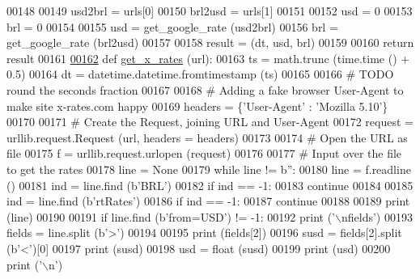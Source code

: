 \begin{DoxyCode}
00148     
00149     usd2brl = urls[0]
00150     brl2usd = urls[1]
00151     
00152     usd = 0
00153     brl = 0
00154     
00155     usd = get\_google\_rate (usd2brl)
00156     brl = get\_google\_rate (brl2usd)
00157     
00158     result = (dt, usd, brl)
00159     
00160     \textcolor{keywordflow}{return} result
00161         
\hyperlink{namespaceraw__urlparser_ab9602b24afd1ae28d96beb085c37410e}{00162} \textcolor{keyword}{def }\hyperlink{namespaceraw__urlparser_ab9602b24afd1ae28d96beb085c37410e}{get\_x\_rates} (url):
00163     ts = math.trunc (time.time () + 0.5)
00164     dt = datetime.datetime.fromtimestamp (ts)
00165     
00166     \textcolor{comment}{# TODO round the seconds fraction}
00167     
00168     \textcolor{comment}{# Adding a fake browser User-Agent to make site x-rates.com happy}
00169     headers = \{\textcolor{stringliteral}{'User-Agent'} : \textcolor{stringliteral}{'Mozilla 5.10'}\}
00170         
00171     \textcolor{comment}{# Create the Request, joining URL and User-Agent}
00172     request = urllib.request.Request (url, headers = headers)
00173 
00174     \textcolor{comment}{# Open the URL as file}
00175     f = urllib.request.urlopen (request)
00176     
00177     \textcolor{comment}{# Input over the file to get the rates}
00178     line = \textcolor{keywordtype}{None}
00179     \textcolor{keywordflow}{while} line != b\textcolor{stringliteral}{''}:
00180         line = f.readline ()
00181         ind = line.find (b\textcolor{stringliteral}{'BRL'})
00182         \textcolor{keywordflow}{if} ind == -1:
00183             \textcolor{keywordflow}{continue} 
00184         
00185         ind = line.find (b\textcolor{stringliteral}{'rtRates'})
00186         \textcolor{keywordflow}{if} ind == -1:
00187             \textcolor{keywordflow}{continue} 
00188         
00189         \textcolor{keywordflow}{print} (line)
00190         
00191         \textcolor{keywordflow}{if} line.find (b\textcolor{stringliteral}{'from=USD'}) != -1:
00192             \textcolor{keywordflow}{print} (\textcolor{stringliteral}{'\(\backslash\)nfields'})
00193             fields = line.split (b\textcolor{stringliteral}{'>'})
00194             
00195             \textcolor{keywordflow}{print} (fields[2])
00196             susd = fields[2].split (b\textcolor{stringliteral}{'<'})[0]
00197             \textcolor{keywordflow}{print} (susd)
00198             usd = float (susd)
00199             \textcolor{keywordflow}{print} (usd)
00200             \textcolor{keywordflow}{print} (\textcolor{stringliteral}{'\(\backslash\)n'})

\end{DoxyCode}
